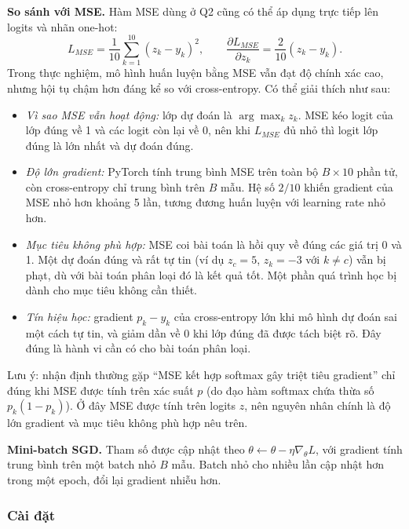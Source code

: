 \textbf{So sánh với MSE.} Hàm MSE dùng ở Q2 cũng có thể áp dụng trực tiếp
lên logits và nhãn one-hot:
\begin{equation}
L_{MSE} = \frac{1}{10}\sum_{k=1}^{10} (z_k - y_k)^2, \qquad
\frac{\partial L_{MSE}}{\partial z_k} = \frac{2}{10}(z_k - y_k).
\end{equation}
Trong thực nghiệm, mô hình huấn luyện bằng MSE vẫn đạt độ chính xác cao,
nhưng hội tụ chậm hơn đáng kể so với cross-entropy. Có thể giải thích như
sau:
\begin{itemize}
  \item \emph{Vì sao MSE vẫn hoạt động:} lớp dự đoán là $\arg\max_k z_k$.
  MSE kéo logit của lớp đúng về 1 và các logit còn lại về 0, nên khi
  $L_{MSE}$ đủ nhỏ thì logit lớp đúng là lớn nhất và dự đoán đúng.
  \item \emph{Độ lớn gradient:} PyTorch tính trung bình MSE trên toàn bộ
  $B \times 10$ phần tử, còn cross-entropy chỉ trung bình trên $B$ mẫu. Hệ số
  $2/10$ khiến gradient của MSE nhỏ hơn khoảng 5 lần, tương đương huấn luyện
  với learning rate nhỏ hơn.
  \item \emph{Mục tiêu không phù hợp:} MSE coi bài toán là hồi quy về đúng
  các giá trị 0 và 1. Một dự đoán đúng và rất tự tin (ví dụ $z_c = 5$,
  $z_k = -3$ với $k \neq c$) vẫn bị phạt, dù với bài toán phân loại đó là
  kết quả tốt. Một phần quá trình học bị dành cho mục tiêu không cần thiết.
  \item \emph{Tín hiệu học:} gradient $p_k - y_k$ của cross-entropy lớn khi
  mô hình dự đoán sai một cách tự tin, và giảm dần về 0 khi lớp đúng đã
  được tách biệt rõ. Đây đúng là hành vi cần có cho bài toán phân loại.
\end{itemize}
Lưu ý: nhận định thường gặp ``MSE kết hợp softmax gây triệt tiêu gradient''
chỉ đúng khi MSE được tính trên xác suất $p$ (do đạo hàm softmax chứa thừa
số $p_k(1 - p_k)$). Ở đây MSE được tính trên logits $z$, nên nguyên nhân
chính là độ lớn gradient và mục tiêu không phù hợp nêu trên.

\textbf{Mini-batch SGD.} Tham số được cập nhật theo
$\theta \leftarrow \theta - \eta \nabla_\theta L$, với gradient tính trung
bình trên một batch nhỏ $B$ mẫu. Batch nhỏ cho nhiều lần cập nhật hơn trong
một epoch, đổi lại gradient nhiễu hơn.

\subsubsection{Cài đặt}

